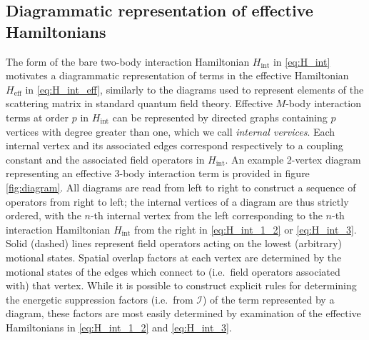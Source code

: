 \documentclass[preprint,showkeys,nofootinbib]{revtex4-1}
\renewcommand{\t}{\text} %
\newcommand{\I}{\mathcal{I}}
\newcommand{\1}{\mathds{1}}
\begin{document}
\subsection{Diagrammatic representation of effective Hamiltonians}

The form of the bare two-body interaction Hamiltonian $H_{\t{int}}$ in
\eqref{eq:H_int} motivates a diagrammatic representation of terms in
the effective Hamiltonian $H_{\t{eff}}$ in \eqref{eq:H_int_eff},
similarly to the diagrams used to represent elements of the scattering
matrix in standard quantum field theory.  Effective $M$-body
interaction terms at order $p$ in $H_{\t{int}}$ can be represented by
directed graphs containing $p$ vertices with degree greater than one,
which we call {\it internal vervices}.  Each internal vertex and its
associated edges correspond respectively to a coupling constant and
the associated field operators in $H_{\t{int}}$.  An example 2-vertex
diagram representing an effective 3-body interaction term is provided
in figure \ref{fig:diagram}.  All diagrams are read from left to right
to construct a sequence of operators from right to left; the internal
vertices of a diagram are thus strictly ordered, with the $n$-th
internal vertex from the left corresponding to the $n$-th interaction
Hamiltonian $H_{\t{int}}$ from the right in \eqref{eq:H_int_1_2} or
\eqref{eq:H_int_3}.  Solid (dashed) lines represent field operators
acting on the lowest (arbitrary) motional states.  Spatial overlap
factors at each vertex are determined by the motional states of the
edges which connect to (i.e.~field operators associated with) that
vertex.  While it is possible to construct explicit rules for
determining the energetic suppression factors (i.e.~from $\I$) of the
term represented by a diagram, these factors are most easily
determined by examination of the effective Hamiltonians in
\eqref{eq:H_int_1_2} and \eqref{eq:H_int_3}.
\end{document}
